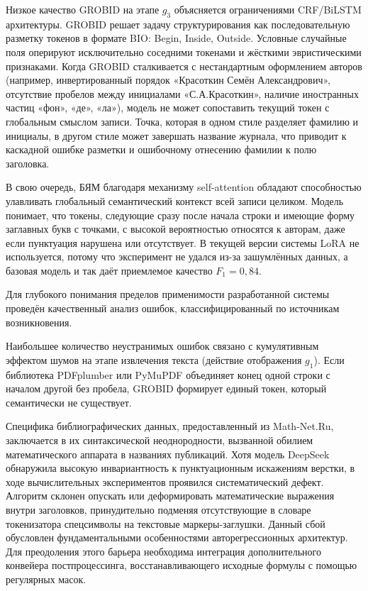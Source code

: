 Низкое качество GROBID на этапе $g_3$ объясняется ограничениями CRF/BiLSTM архитектуры. GROBID решает задачу структурирования как последовательную разметку токенов в формате BIO: Begin, Inside, Outside. Условные случайные поля оперируют исключительно соседними токенами и жёсткими эвристическими признаками. Когда GROBID сталкивается с нестандартным оформлением авторов (например, инвертированный порядок «Красоткин Семён Александрович», отсутствие пробелов между инициалами «С.А.Красоткин», наличие иностранных частиц «фон», «де», «ла»), модель не может сопоставить текущий токен с глобальным смыслом записи. Точка, которая в одном стиле разделяет фамилию и инициалы, в другом стиле может завершать название журнала, что приводит к каскадной ошибке разметки и ошибочному отнесению фамилии к полю заголовка.

В свою очередь, БЯМ благодаря механизму self-attention обладают способностью улавливать глобальный семантический контекст всей записи целиком. Модель понимает, что токены, следующие сразу после начала строки и имеющие форму заглавных букв с точками, с высокой вероятностью относятся к авторам, даже если пунктуация нарушена или отсутствует. В текущей версии системы LoRA не используется, потому что эксперимент не удался из-за зашумлённых данных, а базовая модель и так даёт приемлемое качество $F_1=0,84$.

Для глубокого понимания пределов применимости разработанной системы проведён качественный анализ ошибок, классифицированный по источникам возникновения.

Наибольшее количество неустранимых ошибок связано с кумулятивным эффектом шумов на этапе извлечения текста (действие отображения $g_1$). Если библиотека PDFplumber или PyMuPDF объединяет конец одной строки с началом другой без пробела, GROBID формирует единый токен, который семантически не существует. 

Специфика библиографических данных, предоставленный из Math-Net.Ru, заключается в их синтаксической неоднородности, вызванной обилием математического аппарата в названиях публикаций. Хотя модель DeepSeek обнаружила высокую инвариантность к пунктуационным искажениям верстки, в ходе вычислительных экспериментов проявился систематический дефект. Алгоритм склонен опускать или деформировать математические выражения внутри заголовков, принудительно подменяя отсутствующие в словаре токенизатора спецсимволы на текстовые маркеры-заглушки. Данный сбой обусловлен фундаментальными особенностями авторегрессионных архитектур. Для преодоления этого барьера необходима интеграция дополнительного конвейера постпроцессинга, восстанавливающего исходные формулы с помощью регулярных масок.

